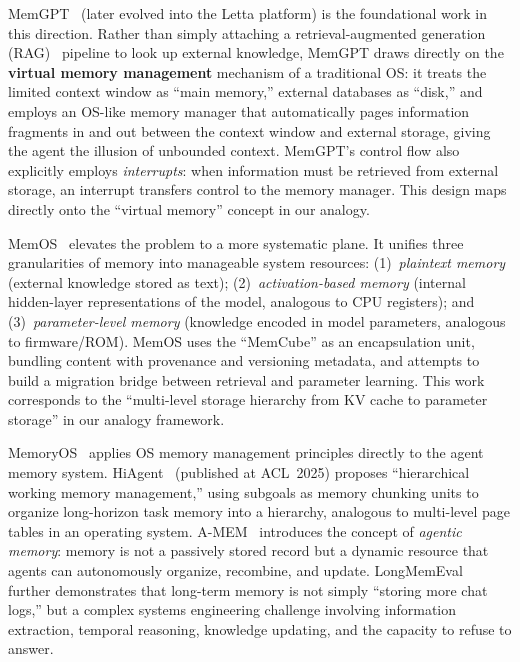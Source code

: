 MemGPT~\cite{memgpt2023} (later evolved into the Letta platform) is the foundational work in this direction.
Rather than simply attaching a retrieval-augmented generation (RAG)~\cite{lewis2020rag} pipeline to look up external knowledge, MemGPT draws directly on the \textbf{virtual memory management} mechanism of a traditional OS:
it treats the limited context window as ``main memory,'' external databases as ``disk,'' and employs an OS-like memory manager that automatically pages information fragments in and out between the context window and external storage, giving the agent the illusion of unbounded context.
MemGPT's control flow also explicitly employs \textit{interrupts}: when information must be retrieved from external storage, an interrupt transfers control to the memory manager.
This design maps directly onto the ``virtual memory'' concept in our analogy.

MemOS~\cite{memos2025} elevates the problem to a more systematic plane.
It unifies three granularities of memory into manageable system resources:
(1)~\textit{plaintext memory} (external knowledge stored as text);
(2)~\textit{activation-based memory} (internal hidden-layer representations of the model, analogous to CPU registers); and
(3)~\textit{parameter-level memory} (knowledge encoded in model parameters, analogous to firmware/ROM).
MemOS uses the ``MemCube'' as an encapsulation unit, bundling content with provenance and versioning metadata, and attempts to build a migration bridge between retrieval and parameter learning.
This work corresponds to the ``multi-level storage hierarchy from KV cache to parameter storage'' in our analogy framework.

MemoryOS~\cite{memoryos2025} applies OS memory management principles directly to the agent memory system.
HiAgent~\cite{hiagent2024} (published at ACL~2025) proposes ``hierarchical working memory management,'' using subgoals as memory chunking units to organize long-horizon task memory into a hierarchy, analogous to multi-level page tables in an operating system.
A-MEM~\cite{amem2025} introduces the concept of \textit{agentic memory}: memory is not a passively stored record but a dynamic resource that agents can autonomously organize, recombine, and update.
LongMemEval~\cite{longmemeval2024} further demonstrates that long-term memory is not simply ``storing more chat logs,'' but a complex systems engineering challenge involving information extraction, temporal reasoning, knowledge updating, and the capacity to refuse to answer.

